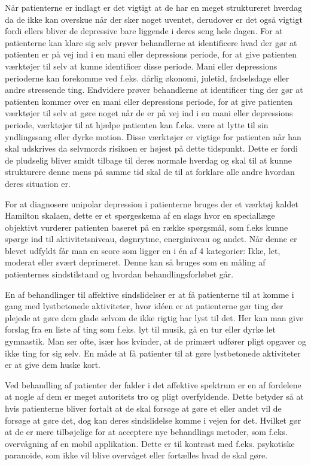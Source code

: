 Når patienterne er indlagt er det vigtigt at de har en meget struktureret hverdag da de ikke kan overskue når der sker noget uventet, derudover er det også vigtigt fordi ellers bliver de depressive bare liggende i deres seng hele dagen.
For at patienterne kan klare sig selv prøver behandlerne at identificere hvad der gør at patienten er på vej ind i en mani eller depressions periode, for at give patienten værktøjer til selv at kunne identificer disse periode. 
Mani eller depressions perioderne kan forekomme ved f.eks. dårlig økonomi, juletid, fødselsdage eller andre stressende ting.
Endvidere prøver behandlerne at identificer ting der gør at patienten kommer over en mani eller depressions periode, for at give patienten værktøjer til selv at gøre noget når de er på vej ind i en mani eller depressions periode, værktøjer til at hjælpe patienten kan f.eks. være at lytte til sin yndlingssang eller dyrke motion.
Disse værktøjer er vigtige for patienten når han skal udskrives da selvmords risikoen er højest på dette tidspunkt.
Dette er fordi de pludselig bliver smidt tilbage til deres normale hverdag og skal til at kunne strukturere denne mens på samme tid skal de til at forklare alle andre hvordan deres situation er.

For at diagnosere unipolar depression i patienterne bruges der et værktøj kaldet Hamilton skalaen, dette er et spørgeskema af en slags hvor en speciallæge objektivt vurderer patienten baseret på en række spørgsmål, som f.eks kunne spørge ind til aktivitetsniveau, døgnrytme, energiniveau og andet.
Når denne er blevet udfyldt får man en score som ligger en i én af 4 kategorier: Ikke, let, moderat eller svært deprimeret. 
Denne kan så bruges som en måling af patienternes sindstilstand og hvordan behandlingsforløbet går.

En af behandlinger til affektive sindslidelser er at få patienterne til at komme i gang med lystbetonede aktiviteter, hvor idéen er at patienterne gør ting der plejede at gøre dem glade selvom de ikke rigtig har lyst til det. 
Her kan man give forslag fra en liste af ting som f.eks. lyt til musik, gå en tur eller dyrke let gymnastik.
Man ser ofte, især hos kvinder, at de primært udfører pligt opgaver og ikke ting for sig selv. 
En måde at få patienter til at gøre lystbetonede aktiviteter er at give dem huske kort.  

Ved behandling af patienter der falder i det affektive spektrum er en af fordelene at nogle af dem er meget autoritets tro og pligt overfyldende.
Dette betyder så at hvis patienterne bliver fortalt at de skal forsøge at gøre et eller andet vil de forsøge at gøre det, dog kan deres sindslidelse komme i vejen for det.
Hvilket gør at de er mere tilbøjelige for at acceptere nye behandlings metoder, som f.eks. overvågning af en mobil applikation. 
Dette er til kontrast med f.eks. psykotiske paranoide, som ikke vil blive overvåget eller fortælles hvad de skal gøre. 


